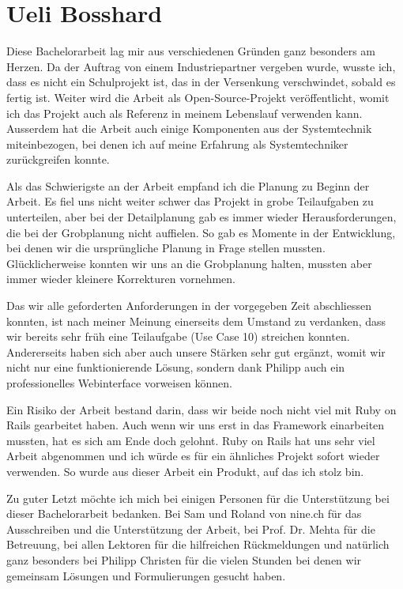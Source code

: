 \section*{Ueli Bosshard}

Diese Bachelorarbeit lag mir aus verschiedenen Gründen ganz besonders am Herzen. Da der Auftrag von einem Industriepartner vergeben wurde, wusste ich, dass es nicht ein Schulprojekt ist, das in der Versenkung verschwindet, sobald es fertig ist. Weiter wird die Arbeit als Open-Source-Projekt veröffentlicht, womit ich das Projekt auch als Referenz in meinem Lebenslauf verwenden kann. Ausserdem hat die Arbeit auch einige Komponenten aus der Systemtechnik miteinbezogen, bei denen ich auf meine Erfahrung als Systemtechniker zurückgreifen konnte.

Als das Schwierigste an der Arbeit empfand ich die Planung zu Beginn der Arbeit. Es fiel uns nicht weiter schwer das Projekt in grobe Teilaufgaben zu unterteilen, aber bei der Detailplanung gab es immer wieder Herausforderungen, die bei der Grobplanung nicht auffielen. So gab es Momente in der Entwicklung, bei denen wir die ursprüngliche Planung in Frage stellen mussten. Glücklicherweise konnten wir uns an die Grobplanung halten, mussten aber immer wieder kleinere Korrekturen vornehmen.

Das wir alle geforderten Anforderungen in der vorgegeben Zeit abschliessen konnten, ist nach meiner Meinung einerseits dem Umstand zu verdanken, dass wir bereits sehr früh eine Teilaufgabe (Use Case 10) streichen konnten. Andererseits haben sich aber auch unsere Stärken sehr gut ergänzt, womit wir nicht nur eine funktionierende Lösung, sondern dank Philipp auch ein professionelles Webinterface vorweisen können.

Ein Risiko der Arbeit bestand darin, dass wir beide noch nicht viel mit Ruby on Rails gearbeitet haben. Auch wenn wir uns erst in das Framework einarbeiten mussten, hat es sich am Ende doch gelohnt. Ruby on Rails hat uns sehr viel Arbeit abgenommen und ich würde es für ein ähnliches Projekt sofort wieder verwenden. So wurde aus dieser Arbeit ein Produkt, auf das ich stolz bin.

Zu guter Letzt möchte ich mich bei einigen Personen für die Unterstützung bei dieser Bachelorarbeit bedanken. Bei Sam und Roland von nine.ch für das Ausschreiben und die Unterstützung der Arbeit, bei Prof. Dr. Mehta für die Betreuung, bei allen Lektoren für die hilfreichen Rückmeldungen und natürlich ganz besonders bei Philipp Christen für die vielen Stunden bei denen wir gemeinsam Lösungen und Formulierungen gesucht haben.